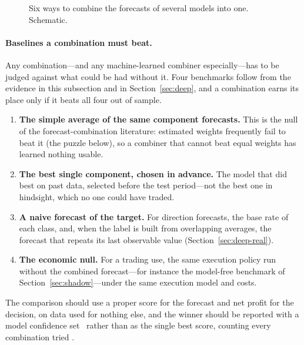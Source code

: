 \begin{figure}[!htbp]
\caption{Six ways to combine the forecasts of several models into one. Schematic.}
\label{fig:combine}
\end{figure}

\paragraph{Baselines a combination must beat.} Any combination---and any machine-learned combiner especially---has to be judged
against what could be had without it. Four benchmarks follow from the evidence in this subsection and in
Section~\ref{sec:deep}, and a combination earns its place only if it beats all four out of sample.
\begin{enumerate}[leftmargin=1.8em,itemsep=2pt]
\item \textbf{The simple average of the same component forecasts.} This is the null of the forecast-combination
  literature: estimated weights frequently fail to beat it (the puzzle below), so a combiner that cannot
  beat equal weights has learned nothing usable.
\item \textbf{The best single component, chosen in advance.} The model that did best on past data, selected
  before the test period---not the best one in hindsight, which no one could have traded.
\item \textbf{A naive forecast of the target.} For direction forecasts, the base rate of each class, and,
  when the label is built from overlapping averages, the forecast that repeats its last observable value
  (Section~\ref{sec:deep-real}).
\item \textbf{The economic null.} For a trading use, the same execution policy run without the combined
  forecast---for instance the model-free benchmark of Section~\ref{sec:shadow}---under the same execution
  model and costs.
\end{enumerate}
The comparison should use a proper score for the forecast and net profit for
the decision, on data used for nothing else, and the winner should be reported with a model confidence
set~\citep{hansen2011mcs} rather than as the single best score, counting every combination tried
\citep{white2000,harvey2016}.


